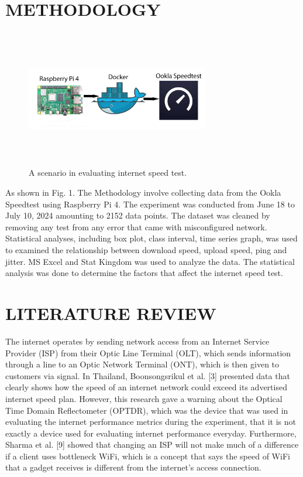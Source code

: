 \documentclass[conference]{IEEEtran}
\begin{document}
\section{METHODOLOGY}
\begin{figure}[!htbp]
\centerline{\includegraphics[width=8cm,height=6cm,keepaspectratio]{Figures/Picture0.png}}
\caption{A scenario in evaluating internet speed test.}
\label{fig1}
\end{figure}
As shown in Fig. 1. The Methodology involve collecting data from the Ookla Speedtest using Raspberry Pi 4.
The experiment was conducted from June 18 to July 10, 2024 amounting to 2152 data points. The dataset was cleaned by removing any test from any error that came with misconfigured network.
Statistical analyses, including box plot, class interval, time series graph, was used to examined the relationship between download speed, upload speed, ping and jitter.
MS Excel and Stat Kingdom was used to analyze the data. The statistical analysis was done to determine the factors that affect the internet speed test.

\section{LITERATURE REVIEW}

The internet operates by sending network access from an Internet Service Provider (ISP) from their Optic Line Terminal (OLT), which sends information through a line to an Optic Network Terminal (ONT), which is then given to customers via signal. In Thailand, Boonsongsrikul et al. [3] presented data that clearly shows how the speed of an internet network could exceed its advertised internet speed plan. However, this research gave a warning about the Optical Time Domain Reflectometer (OPTDR), which was the device that was used in evaluating the internet performance metrics during the experiment, that it is not exactly a device used for evaluating internet performance everyday. Furthermore, Sharma et al. [9] showed that changing an ISP will not make much of a difference if a client uses bottleneck WiFi, which is a concept that says the speed of WiFi that a gadget receives is different from the internet's access connection.
\end{document}
